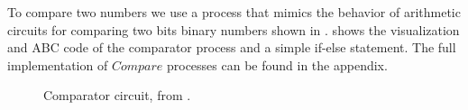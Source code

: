 To compare two numbers we use a process that mimics the behavior of arithmetic circuits for comparing two bits binary numbers shown in 
.
 shows the visualization and ABC code of the comparator process and a simple if-else statement.
The full implementation of $Compare$ processes can be found in the appendix.
\begin{figure}[H]%
\centering
{}
\caption{Comparator circuit, from \cite{comparator}.}
\label{tra_comparator_circuit}%
\end{figure}


